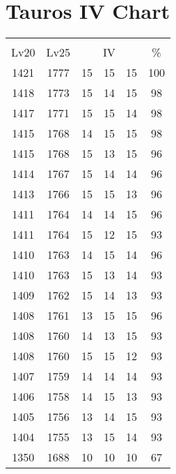 \documentclass{article}%
\begin{document}
%
\normalsize%
\section{Tauros IV Chart}%
\label{sec:Tauros IV Chart}%
\renewcommand{\arraystretch}{1.5}%
\begin{tabular}{|c|c|c|c|c|c|}%
\hline%
\multicolumn{6}{|c|}{\textcolor{white}{ 
\linebreak{Tauros}
}%
\cellcolor{black}}\\%
\multicolumn{1}{|c}{Lv20}&\multicolumn{1}{c|}{Lv25}&\multicolumn{3}{c|}{IV}&\multicolumn{1}{|c|}{\%}\\%
\hline%
\rowcolor{color100}%
1421&1777&15&15&15&100\\%
\hline%
\rowcolor{color98}%
1418&1773&15&14&15&98\\%
\hline%
\rowcolor{color98}%
1417&1771&15&15&14&98\\%
\hline%
\rowcolor{color98}%
1415&1768&14&15&15&98\\%
\hline%
\rowcolor{color96}%
1415&1768&15&13&15&96\\%
\hline%
\rowcolor{color96}%
1414&1767&15&14&14&96\\%
\hline%
\rowcolor{color96}%
1413&1766&15&15&13&96\\%
\hline%
\rowcolor{color96}%
1411&1764&14&14&15&96\\%
\hline%
\rowcolor{color93}%
1411&1764&15&12&15&93\\%
\hline%
\rowcolor{color96}%
1410&1763&14&15&14&96\\%
\hline%
\rowcolor{color93}%
1410&1763&15&13&14&93\\%
\hline%
\rowcolor{color93}%
1409&1762&15&14&13&93\\%
\hline%
\rowcolor{color96}%
1408&1761&13&15&15&96\\%
\hline%
\rowcolor{color93}%
1408&1760&14&13&15&93\\%
\hline%
\rowcolor{color93}%
1408&1760&15&15&12&93\\%
\hline%
\rowcolor{color93}%
1407&1759&14&14&14&93\\%
\hline%
\rowcolor{color93}%
1406&1758&14&15&13&93\\%
\hline%
\rowcolor{color93}%
1405&1756&13&14&15&93\\%
\hline%
\rowcolor{color93}%
1404&1755&13&15&14&93\\%
\hline%
\rowcolor{color91}%
1350&1688&10&10&10&67\\%
\end{tabular}

%
\end{document}
